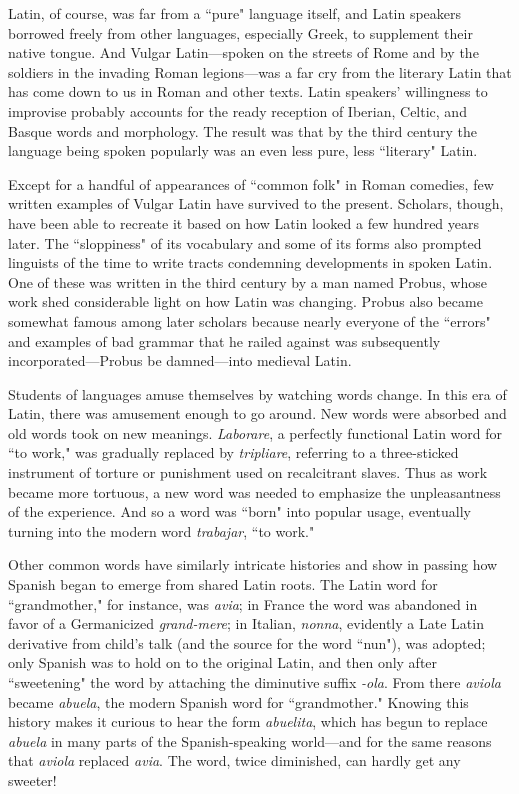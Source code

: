 Latin, of course, was far from a ``pure" language itself, and
Latin speakers borrowed freely from other languages, especially Greek,
to supplement their native tongue. And Vulgar Latin---spoken on the
streets of Rome and by the soldiers in the invading Roman legions---was a far cry from the literary Latin that has come down to us in Roman and other texts. Latin speakers' willingness to improvise probably
accounts for the ready reception of Iberian, Celtic, and Basque words
and morphology. The result was that by the third century the language
being spoken popularly was an even less pure, less ``literary" Latin.

Except for a handful of appearances of ``common folk" in Roman comedies, few written examples of Vulgar Latin have survived
to the present. Scholars, though, have been able to recreate it based
on how Latin looked a few hundred years later. The ``sloppiness" of
its vocabulary and some of its forms also prompted linguists of the
time to write tracts condemning developments in spoken Latin. One
of these was written in the third century by a man named Probus,
whose work shed considerable light on how Latin was changing. Probus also became somewhat famous among later scholars because
nearly everyone of the ``errors" and examples of bad grammar that he
railed against was subsequently incorporated---Probus be damned---into medieval Latin.

Students of languages amuse themselves by watching words
change. In this era of Latin, there was amusement enough to go
around. New words were absorbed and old words took on new meanings. \emph{Laborare}, a perfectly functional Latin word for ``to work," was
gradually replaced by \emph{tripliare}, referring to a three-sticked instrument
of torture or punishment used on recalcitrant slaves. Thus as work
became more tortuous, a new word was needed to emphasize the unpleasantness of the experience. And so a word was ``born" into popular
usage, eventually turning into the modern word \emph{trabajar}, ``to work."

Other common words have similarly intricate histories and
show in passing how Spanish began to emerge from shared Latin roots.
The Latin word for ``grandmother," for instance, was \emph{avia}; in France
the word was abandoned in favor of a Germanicized \emph{grand-mere}; in
Italian, \emph{nonna}, evidently a Late Latin derivative from child's talk (and
the source for the word ``nun"), was adopted; only Spanish was to hold
on to the original Latin, and then only after ``sweetening" the word
by attaching the diminutive suffix \emph{-ola}. From there \emph{aviola} became
\emph{abuela}, the modern Spanish word for ``grandmother." Knowing this
history makes it curious to hear the form \emph{abuelita}, which has begun to
replace \emph{abuela} in many parts of the Spanish-speaking world---and for
the same reasons that \emph{aviola} replaced \emph{avia}. The word, twice diminished, can hardly get any sweeter!

